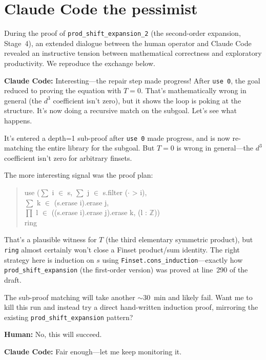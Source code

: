 \documentclass[11pt]{article}
\theoremstyle{definition}
\theoremstyle{remark}
\begin{document}
\section{Claude Code the pessimist}

During the proof of \texttt{prod\_shift\_expansion\_2} (the second-order expansion, Stage~4), an extended dialogue between the human operator and Claude Code revealed an instructive tension between mathematical correctness and exploratory productivity. We reproduce the exchange below.

\medskip
\noindent\textbf{Claude Code:} Interesting---the repair step made progress! After \texttt{use 0}, the goal reduced to proving the equation with $T = 0$. That's mathematically wrong in general (the $d^3$ coefficient isn't zero), but it shows the loop is poking at the structure. It's now doing a recursive match on the subgoal. Let's see what happens.

\medskip
It's entered a depth=1 sub-proof after \texttt{use 0} made progress, and is now re-matching the entire library for the subgoal. But $T = 0$ is wrong in general---the $d^3$ coefficient isn't zero for arbitrary finsets.

The more interesting signal was the proof plan:
\begin{quote}\ttfamily\small
use ($\sum$ i $\in$ s, $\sum$ j $\in$ s.filter ($\cdot$ > i),\\
\phantom{use (}$\sum$ k $\in$ (s.erase i).erase j,\\
\phantom{use (}\phantom{$\sum$ k $\in$ }$\prod$ l $\in$ ((s.erase i).erase j).erase k, (l : $\mathbb{Z}$))\\
ring
\end{quote}
That's a plausible witness for $T$ (the third elementary symmetric product), but \texttt{ring} almost certainly won't close a Finset product/sum identity. The right strategy here is induction on $s$ using \texttt{Finset.cons\_induction}---exactly how \texttt{prod\_shift\_expansion} (the first-order version) was proved at line~290 of the draft.

The sub-proof matching will take another ${\sim}30$~min and likely fail. Want me to kill this run and instead try a direct hand-written induction proof, mirroring the existing \texttt{prod\_shift\_expansion} pattern?

\medskip
\noindent\textbf{Human:} No, this will succeed.

\medskip
\noindent\textbf{Claude Code:} Fair enough---let me keep monitoring it.
\end{document}
